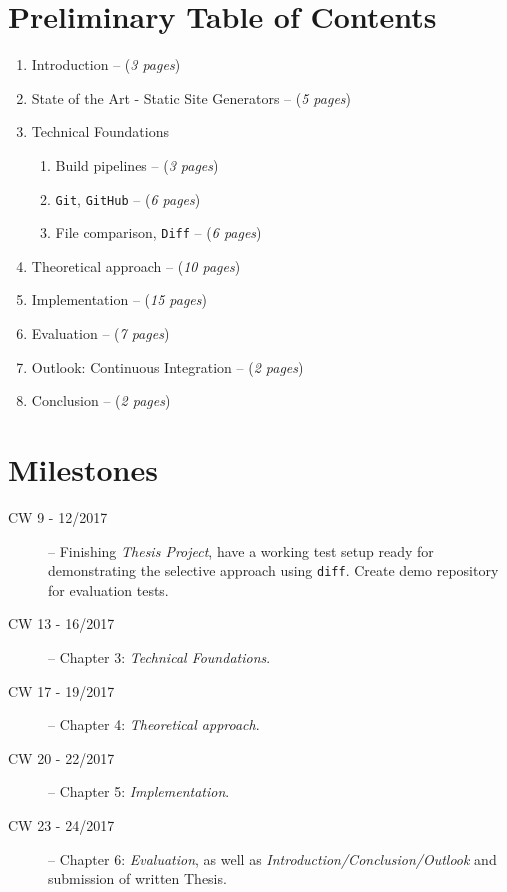 \documentclass[a4paper,english,11pt]{article}
\begin{document}
\section{Preliminary Table of Contents}
\begin{enumerate}
\item Introduction -- (\emph{3 pages})
\item State of the Art - Static Site Generators -- (\emph{5 pages})
\item Technical Foundations

\begin{enumerate}
\item Build pipelines -- (\emph{3 pages})
\item \texttt{Git}, \texttt{GitHub} -- (\emph{6 pages})
\item File comparison, \texttt{Diff} -- (\emph{6 pages})
\end{enumerate}
\item Theoretical approach -- (\emph{10 pages})
\item Implementation -- (\emph{15 pages})
\item Evaluation -- (\emph{7 pages})
\item Outlook: Continuous Integration -- (\emph{2 pages})
\item Conclusion -- (\emph{2 pages})
\end{enumerate}

\section{Milestones}
\begin{description}
\item [CW 9 - 12/2017] -- Finishing \emph{Thesis Project}, have a working test setup ready for demonstrating the selective approach using \texttt{diff}. Create demo repository for evaluation tests.
\item[CW 13 - 16/2017] -- Chapter 3: \emph{Technical Foundations}.
\item [CW 17 - 19/2017] -- Chapter 4: \emph{Theoretical approach}.
\item [CW 20 - 22/2017] -- Chapter 5: \emph{Implementation}.
\item [CW 23 - 24/2017] -- Chapter 6: \emph{Evaluation}, as well as \emph{Introduction/Conclusion/Outlook} and submission of written Thesis.
\end{description}
\end{document}
